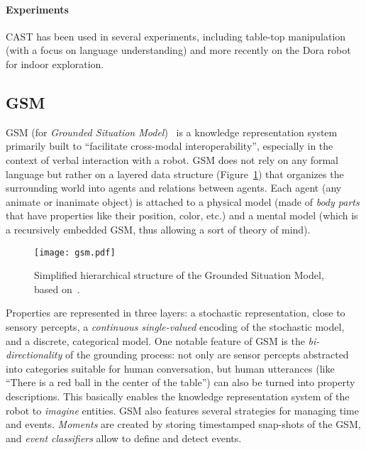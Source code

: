\documentclass[journal]{IEEEtran}
\begin{document}
\paragraph{Experiments} CAST has been used in several experiments, including
table-top manipulation (with a focus on language understanding) and more
recently on the Dora robot~\cite{Hawes2011} for indoor exploration.


\subsection{GSM}
\label{sect|gsm}

GSM (for \emph{Grounded Situation Model})~\cite{Mavridis2006} is a knowledge
representation system primarily built to ``facilitate cross-modal
interoperability'',  especially in the context of verbal interaction with a
robot.
% 
GSM does not rely on any formal language but rather on a layered data structure
(Figure~\ref{fig|gsm}) that organizes the surrounding world into agents and
relations between agents.  Each agent (any animate or inanimate object) is
attached to a physical model (made of \emph{body parts} that have properties
like their position, color, etc.) and a mental model (which is a recursively
embedded GSM, thus allowing a sort of theory of mind).

\begin{figure}
    \centering
    \texttt{[image: gsm.pdf]}

    \caption{Simplified hierarchical structure of the Grounded Situation Model,
    based on~\cite{Mavridis2006}.}

    \label{fig|gsm}
\end{figure}

Properties are represented in three layers: a stochastic representation, close
to sensory percepts, a \emph{continuous single-valued} encoding of the
stochastic model, and a discrete, categorical model.
% 
One notable feature of GSM is the \emph{bi-directionality} of the grounding
process: not only are sensor percepts abstracted into categories suitable for
human conversation, but human utterances (like ``There is a red ball in the
center of the table'') can also be turned into property descriptions. This
basically enables the knowledge representation system of the robot to
\emph{imagine} entities.
% 
GSM also features several strategies for managing time and events.
\emph{Moments} are created by storing timestamped snap-shots of the GSM, and
\emph{event classifiers} allow to define and detect events.
\end{document}
